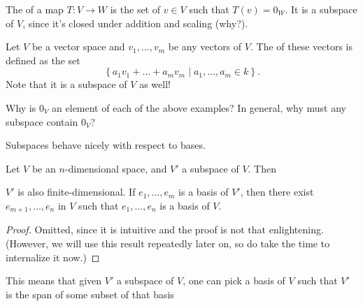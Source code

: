\begin{example}[Kernels]
	The  of a map $T \colon V \to W$ is the
	set of $v \in V$ such that $T(v) = 0_W$.
	It is a subspace of $V$, since it's closed under addition and scaling (why?).
\end{example}
\begin{example}[Spans]
	Let $V$ be a vector space and $v_1, \dots, v_m$ be any vectors of $V$.
	The  of these vectors is defined as the set
	\[ \left\{ a_1 v_1 + \dots + a_m v_m \mid a_1, \dots, a_m \in k \right\}. \]
	Note that it is a subspace of $V$ as well!
\end{example}
\begin{ques}
	Why is $0_V$ an element of each of the above examples?
	In general, why must any subspace contain $0_V$?
\end{ques}

Subspaces behave nicely with respect to bases.
\begin{theorem}
	\label{thm:basis_completion}
	Let $V$ be an $n$-dimensional space, and $V'$ a subspace of $V$.
	Then
	\begin{enumerate}[(a)]
		\ii $V'$ is also finite-dimensional.
		\ii If $e_1, \dots, e_m$ is a basis of $V'$, then there exist
		$e_{m+1}, \dots, e_n$ in $V$ such that
		$e_1, \dots, e_n$ is a basis of $V$.
	\end{enumerate}
\end{theorem}
\begin{proof}
	Omitted, since it is intuitive and the proof is not that enlightening.
	(However, we will use this result repeatedly later on,
	so do take the time to internalize it now.)
\end{proof}
This means that given $V'$ a subspace of $V$,
one can pick a basis of $V$ such that
$V'$ is the span of some subset of that basis

